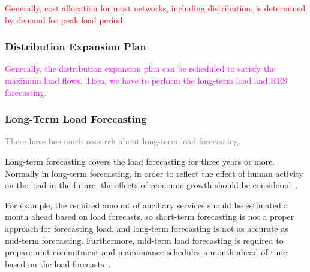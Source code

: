 \documentclass[journal]{IEEEtran} %
\begin{document}
\textcolor{red}{Generally, cost allocation for most networks, including distribution, is determined by demand for peak load period.}



\subsubsection{Distribution Expansion Plan}
\textcolor{magenta}{Generally, the distribution expansion plan can be scheduled to satisfy the maximum load flows.
%
%
%
%
%
%
%
%
%
Then, we have to perform the long-term load and RES forecasting.}








\vspace{1.2in}














\subsubsection{Long-Term Load Forecasting}
\textcolor{gray}{There have bee much research about long-term load forecasting.}


Long-term forecasting covers the load forecasting for three years or more. Normally in long-term forecasting, in order to reflect the effect of human activity on the load in the future, the effects of economic growth should be considered~\cite{Tao2014}. 






For example, the required amount of ancillary services should be estimated a month ahead based on load forecasts, so short-term forecasting is not a proper approach for forecasting load, and long-term forecasting is not as accurate as mid-term forecasting. Furthermore, mid-term load forecasting is required to prepare unit commitment and maintenance schedules a month ahead of time based on the load forecasts~\cite{burger2014managing}.
\end{document}
